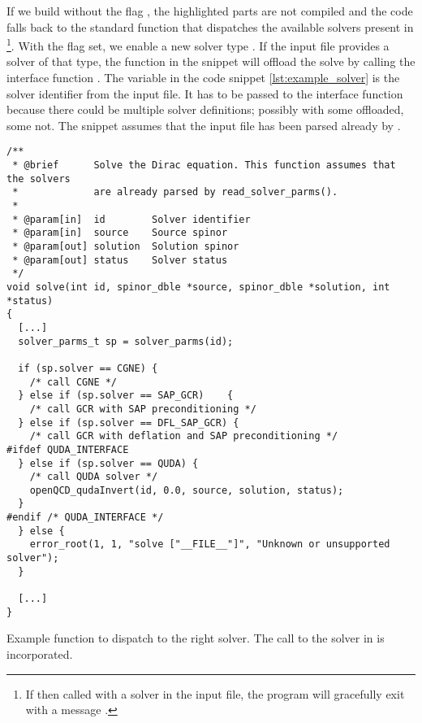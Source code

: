 If we build without the flag , the highlighted parts are not compiled and the code falls back to the standard function that dispatches the available solvers present in \openqxd
\footnote{If then called with a \quda solver in the input file, the program will gracefully exit with a message .}.
With the flag set, we enable a new solver type .
If the input file provides a solver of that type, the function in the snippet will offload the solve by calling the interface function .
The variable  in the code snippet \cref{lst:example_solver} is the solver identifier from the input file.
It has to be passed to the interface function because there could be multiple solver definitions; possibly with some offloaded, some not.
The snippet assumes that the input file has been parsed already by .
\begin{codelisting}
\begin{verbatim}
/**
 * @brief      Solve the Dirac equation. This function assumes that the solvers
 *             are already parsed by read_solver_parms().
 *
 * @param[in]  id        Solver identifier
 * @param[in]  source    Source spinor
 * @param[out] solution  Solution spinor
 * @param[out] status    Solver status
 */
void solve(int id, spinor_dble *source, spinor_dble *solution, int *status)
{
  [...]
  solver_parms_t sp = solver_parms(id);

  if (sp.solver == CGNE) {
    /* call CGNE */
  } else if (sp.solver == SAP_GCR)    {
    /* call GCR with SAP preconditioning */
  } else if (sp.solver == DFL_SAP_GCR) {
    /* call GCR with deflation and SAP preconditioning */
#ifdef QUDA_INTERFACE
  } else if (sp.solver == QUDA) {
    /* call QUDA solver */
    openQCD_qudaInvert(id, 0.0, source, solution, status);
  }
#endif /* QUDA_INTERFACE */
  } else {
    error_root(1, 1, "solve ["__FILE__"]", "Unknown or unsupported solver");
  }

  [...]
}
\end{verbatim}
\caption{Example function to dispatch to the right solver. The call to the solver in \quda is incorporated.}
\label{lst:example_solver}
\end{codelisting}


